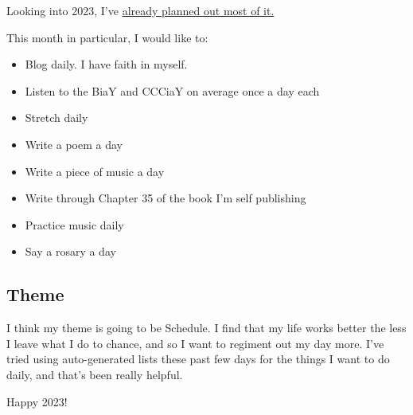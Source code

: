 \documentclass[12pt]{article}[titlepage]
\renewcommand{\,}{\textsuperscript{,}}
\begin{document}
Looking into 2023, I've \href{new-year-plans-23.html}{already planned out most of it.}

This month in particular, I would like to:
\begin{itemize}
\item Blog daily. I have faith in myself.
\item Listen to the BiaY and CCCiaY on average once a day each
\item Stretch daily
\item Write a poem a day
\item Write a piece of music a day
\item Write through Chapter 35 of the book I'm self publishing
\item Practice music daily
\item Say a rosary a day
\end{itemize}

\subsection{Theme}
I think my theme is going to be Schedule.
I find that my life works better the less I leave what I do to chance, and so I want to regiment out my day more.
I've tried using auto-generated lists these past few days for the things I want to do daily, and that's been really helpful.

Happy 2023! 
\end{document}
